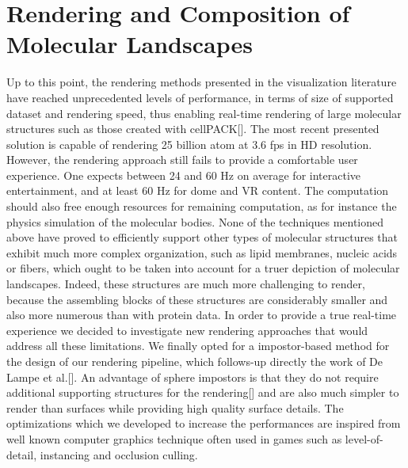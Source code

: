 
%
%

\section{Rendering and Composition of Molecular Landscapes}

Up to this point, the rendering methods presented in the visualization literature have reached unprecedented levels of performance, in terms of size of supported dataset and rendering speed, thus enabling real-time rendering of large molecular structures such as those created with cellPACK[].
The most recent presented solution is capable of rendering 25 billion atom at 3.6 fps in HD resolution.
However, the rendering approach still fails to provide a comfortable user experience.
One expects between 24 and 60 Hz on average for interactive entertainment, and at least 60 Hz for dome and VR content.
The computation should also free enough resources for remaining computation, as for instance the physics simulation of the molecular bodies.
None of the techniques mentioned above have proved to efficiently support other types of molecular structures that exhibit much more complex organization, such as lipid membranes, nucleic acids or fibers, which ought to be taken into account for a truer depiction of molecular landscapes.
Indeed, these structures are much more challenging to render, because the assembling blocks of these structures are considerably smaller and also more numerous than with protein data.
In order to provide a true real-time experience we decided to investigate new rendering approaches that would address all these limitations.
We finally opted for a impostor-based method for the design of our rendering pipeline, which follows-up directly the work of De Lampe et al.[].
An advantage of sphere impostors is that they do not require additional supporting structures for the rendering[] and are also much simpler to render than surfaces while providing high quality surface details.
The optimizations which we developed to increase the performances are inspired from well known computer graphics technique often used in games such as level-of-detail, instancing and occlusion culling.

